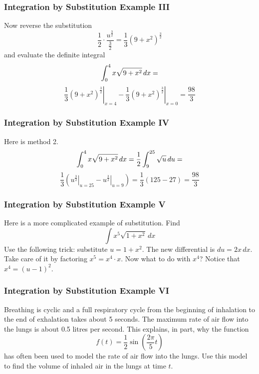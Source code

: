 \documentclass[xcolor=dvipsnames]{beamer}
\begin{document}
\begin{frame}
  \frametitle{Integration by Substitution Example III}
Now reverse the substitution
\begin{equation}
  \label{eq:shaixeen}
\frac{1}{2}\cdot\frac{u^{\frac{3}{2}}}{\frac{3}{2}}=\frac{1}{3}(9+x^{2})^{\frac{3}{2}}
\end{equation}
and evaluate the definite integral
\begin{equation}
  \label{eq:eileevar}
\int_{0}^{4}x\sqrt{9+x^{2}}\,dx=\notag
\end{equation}
\begin{equation}
  \label{eq:lumuewah}
\left.\frac{1}{3}(9+x^{2})^{\frac{3}{2}}\right\vert_{x=4}-\left.\frac{1}{3}(9+x^{2})^{\frac{3}{2}}\right\vert_{x=0}=\frac{98}{3}
\end{equation}
\end{frame}

\begin{frame}
  \frametitle{Integration by Substitution Example IV}
Here is method 2.
\begin{equation}
  \label{eq:waethish}
  \int_{0}^{4}x\sqrt{9+x^{2}}\,dx=\frac{1}{2}\int_{9}^{25}\sqrt{u}\,du=\notag
\end{equation}
\begin{equation}
  \label{eq:anguyaeh}
  \frac{1}{3}\left(\left.u^{\frac{3}{2}}\right\vert_{u=25}-\left.u^{\frac{3}{2}}\right\vert_{u=9}\right)=\frac{1}{3}(125-27)=\frac{98}{3}
\end{equation}
\end{frame}

\begin{frame}
  \frametitle{Integration by Substitution Example V}
   Here is a more complicated
  example of substitution. Find
  \begin{equation}
    \label{eq:jiucaing}
    \int{}x^{5}\sqrt{1+x^{2}}\,dx
  \end{equation}
  Use the following trick: substitute $u=1+x^{2}$. The new
  differential is $du=2x\,dx$. Take care of it by factoring
  $x^{5}=x^{4}\cdot{}x$. Now what to do with $x^{4}$? Notice that
  $x^{4}=(u-1)^{2}$.
\end{frame}

\begin{frame}
  \frametitle{Integration by Substitution Example VI}
  Breathing is cyclic and a full respiratory cycle from the beginning
  of inhalation to the end of exhalation takes about 5 seconds. The
  maximum rate of air flow into the lungs is about 0.5 litres per second. This
  explains, in part, why the function 
  \begin{equation}
    \label{eq:eisohmie}
    f(t)=\frac{1}{2}\sin\left(\frac{2\pi}{5}t\right)
  \end{equation}
  has often been used to model the rate of air flow into the lungs.
  Use this model to find the volume of inhaled air in the lungs at
  time $t$.
\end{frame}
\end{document}
